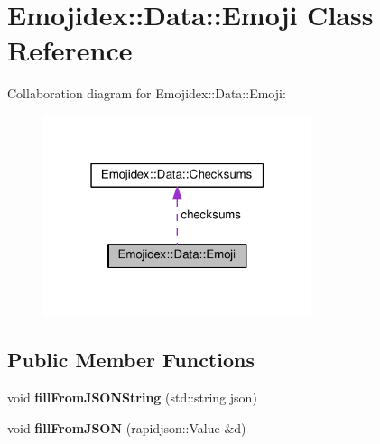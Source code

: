 \hypertarget{classEmojidex_1_1Data_1_1Emoji}{}\section{Emojidex\+:\+:Data\+:\+:Emoji Class Reference}
\label{classEmojidex_1_1Data_1_1Emoji}


Collaboration diagram for Emojidex\+:\+:Data\+:\+:Emoji\+:\nopagebreak
\begin{figure}[H]
\begin{center}
\leavevmode
\includegraphics[width=223pt]{classEmojidex_1_1Data_1_1Emoji__coll__graph}
\end{center}
\end{figure}
\subsection*{Public Member Functions}
\begin{DoxyCompactItemize}
\item 
void {\bfseries fill\+From\+J\+S\+O\+N\+String} (std\+::string json)\hypertarget{classEmojidex_1_1Data_1_1Emoji_a81aa3a7621b4393bc211c4d67a153182}{}\label{classEmojidex_1_1Data_1_1Emoji_a81aa3a7621b4393bc211c4d67a153182}

\item 
void {\bfseries fill\+From\+J\+S\+ON} (rapidjson\+::\+Value \&d)\hypertarget{classEmojidex_1_1Data_1_1Emoji_ad173ee5dee8d6f6e807674fe7c73812f}{}\label{classEmojidex_1_1Data_1_1Emoji_ad173ee5dee8d6f6e807674fe7c73812f}

\end{DoxyCompactItemize}
